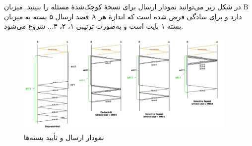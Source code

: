 در شکل زیر می‌توانید نمودار ارسال برای نسخهٔ کوچک‌شدهٔ مسئله را ببینید. میزبان B قصد ارسال ۵ بسته به میزبان A دارد و برای سادگی فرض شده است که اندازهٔ هر بسته ۱ بایت است و به‌صورت ترتیبی ۱، ۲، ۳... شروع می‌شود.

\begin{figure}[h!]
\centering
\includegraphics[width=0.95\textwidth]{Solutions/pics/Q5_solution.png}
\caption{نمودار ارسال و تأیید بسته‌ها}
\label{fig:small-example}
\end{figure}
